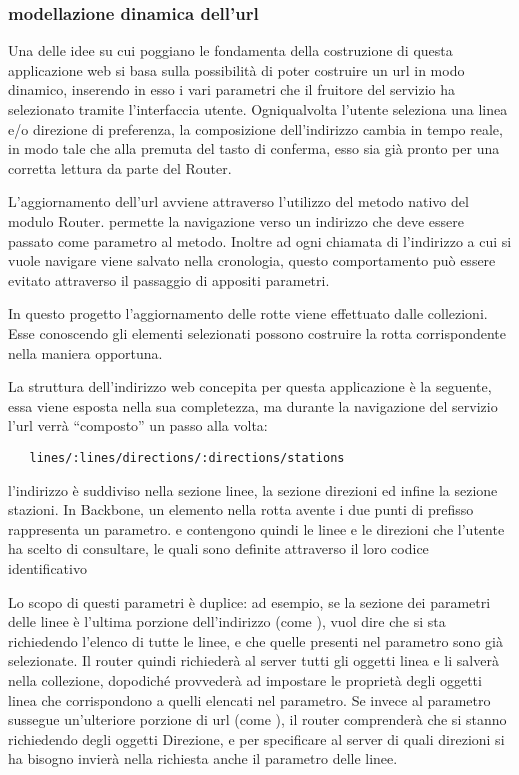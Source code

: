 \subsubsection{modellazione dinamica dell'url} %
\label{ssub:modellazione_dinamica_dell_url}


Una delle idee su cui poggiano le fondamenta della costruzione di questa applicazione web si basa sulla possibilità di poter costruire un url in modo dinamico, inserendo in esso i vari parametri che il fruitore del servizio ha selezionato tramite l'interfaccia utente.
Ogniqualvolta l'utente seleziona una linea e/o direzione di preferenza, la composizione dell'indirizzo cambia in tempo reale, in modo tale che alla premuta del tasto di conferma, esso sia già pronto per una corretta lettura da parte del Router.

L'aggiornamento dell'url avviene attraverso l'utilizzo del metodo nativo  del modulo Router.  permette la navigazione verso un indirizzo che deve essere passato come parametro al metodo. Inoltre ad ogni chiamata di  l'indirizzo a cui si vuole navigare viene salvato nella cronologia, questo comportamento può essere evitato attraverso il passaggio di appositi parametri.

In questo progetto l'aggiornamento delle rotte viene effettuato dalle collezioni. Esse conoscendo gli elementi selezionati  possono costruire la rotta corrispondente nella maniera opportuna.

La struttura dell'indirizzo web concepita per questa applicazione è la seguente, essa viene esposta nella sua completezza, ma durante la navigazione del servizio l'url verrà ``composto'' un passo alla volta:

\begin{verbatim}
   lines/:lines/directions/:directions/stations
\end{verbatim}

l'indirizzo è suddiviso nella sezione linee, la sezione direzioni ed infine la sezione stazioni. In Backbone, un elemento nella rotta avente i  due punti di prefisso rappresenta un parametro.  e  contengono quindi le linee e le direzioni che l'utente ha scelto di consultare, le quali sono definite attraverso il loro codice identificativo

Lo scopo di questi parametri è duplice: ad esempio, se la sezione dei parametri delle linee è l'ultima porzione dell'indirizzo (come ), vuol dire che si sta richiedendo l'elenco di tutte le linee, e che quelle presenti nel parametro sono già selezionate. Il router quindi richiederà al server tutti gli oggetti linea e li salverà nella collezione, dopodiché provvederà ad impostare le proprietà  degli oggetti linea che corrispondono a quelli elencati nel parametro.
Se invece al parametro sussegue un'ulteriore porzione di url (come ), il router comprenderà che si stanno richiedendo degli oggetti Direzione, e per specificare al server di quali direzioni si ha bisogno invierà nella richiesta anche il parametro delle linee.

